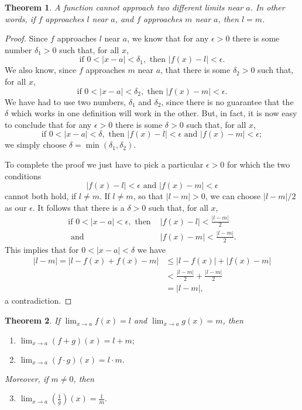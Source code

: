 \documentclass{article}
\numberwithin{definition}{subsection}
\numberwithin{lemma}{subsection}
\newtheorem{theorem}{Theorem}
\numberwithin{theorem}{subsection}
\begin{document}
\begin{theorem}
  A function cannot approach two different limits near $a$. In other words, if
  $f$ approaches $l$ near $a$, and $f$ approaches $m$ near $a$, then $l = m$.
\end{theorem}
\begin{proof}
  Since $f$ approaches $l$ near $a$, we know that for any $\epsilon > 0$ there
  is some number $\delta_1 > 0$ such that, for all $x$, \[
    \text{if } 0 < |x - a| < \delta_1, \text{ then } |f(x) - l| < \epsilon.
  \] We also know, since $f$ approaches $m$ near $a$, that there is some
  $\delta_2 > 0$ such that, for all $x$, \[
    \text{if } 0 < |x - a| < \delta_2, \text{ then } |f(x) - m| < \epsilon.
  \] We have had to use two numbers, $\delta_1$ and $\delta_2$, since there is
  no guarantee that the $\delta$ which works in one definition will work in the
  other. But, in fact, it is now easy to conclude that for any $\epsilon > 0$
  there is some $\delta > 0$ such that, for all $x$, \[
    \text{if } 0 < |x - a| < \delta, \text{ then } |f(x) - l| < \epsilon
    \text{ and } |f(x) - m| < \epsilon;
  \] we simply choose $\delta = \min(\delta_1, \delta_2)$.

  To complete the proof we just have to pick a particular $\epsilon > 0$ for
  which the two conditions \[
    |f(x) - l| < \epsilon \text{ and } |f(x) - m| < \epsilon
  \] cannot both hold, if $l \neq m$. If $l \neq m$, so that $|l - m| > 0$, we
  can choose $|l - m|/2$ as our $\epsilon$. It follows that there is a $\delta
  > 0$ such that, for all $x$,
  \begin{align*}
    \text{if } 0 < |x - a| < \epsilon,
    \text{ then } &|f(x) - l| < \frac{|l - m|}{2} \\
    \text{ and } &|f(x) - m| < \frac{|l - m|}{2}.
  \end{align*}
  This implies that for $0 < |x - a| < \delta$ we have
  \begin{align*}
    |l - m| = |l - f(x) + f(x) - m|
    &\leq |l - f(x)| + |f(x) - m| \\
    &< \frac{|l - m|}{2} + \frac{|l - m|}{2} \\
    &= |l - m|,
  \end{align*}
  a contradiction.
\end{proof}

\begin{theorem}
  If $\lim_{x \to a}f(x) = l$ and $\lim_{x \to a}g(x) = m$, then
  \begin{enumerate}
    \item $\lim_{x \to a}(f + g)(x) = l + m;$
    \item $\lim_{x \to a}(f \cdot g)(x) = l \cdot m.$
  \end{enumerate}
  Moreover, if $m \neq 0$, then
  \begin{enumerate}
    \setcounter{enumi}{2}
    \item $\lim_{x \to a}\left(\frac{1}{g}\right)(x) = \frac{1}{m}.$
  \end{enumerate}
\end{theorem}
\end{document}
